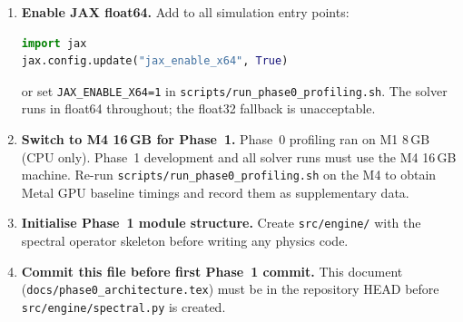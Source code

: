 \documentclass[11pt, a4paper]{article}
\begin{document}
\begin{enumerate}

\item \textbf{Enable JAX float64.}
  Add to all simulation entry points:
\begin{lstlisting}[language=Python]
import jax
jax.config.update("jax_enable_x64", True)
\end{lstlisting}
  or set \texttt{JAX\_ENABLE\_X64=1} in \texttt{scripts/run\_phase0\_profiling.sh}.
  The solver runs in float64 throughout; the float32 fallback is unacceptable.

\item \textbf{Switch to M4 16\,GB for Phase~1.}
  Phase~0 profiling ran on M1 8\,GB (CPU only).
  Phase~1 development and all solver runs must use the M4 16\,GB machine.
  Re-run \texttt{scripts/run\_phase0\_profiling.sh} on the M4 to obtain
  Metal GPU baseline timings and record them as supplementary data.

\item \textbf{Initialise Phase~1 module structure.}
  Create \texttt{src/engine/} with the spectral operator skeleton
  before writing any physics code.

\item \textbf{Commit this file before first Phase~1 commit.}
  This document (\texttt{docs/phase0\_architecture.tex}) must be in the
  repository HEAD before \texttt{src/engine/spectral.py} is created.

\end{enumerate}

\end{document}
